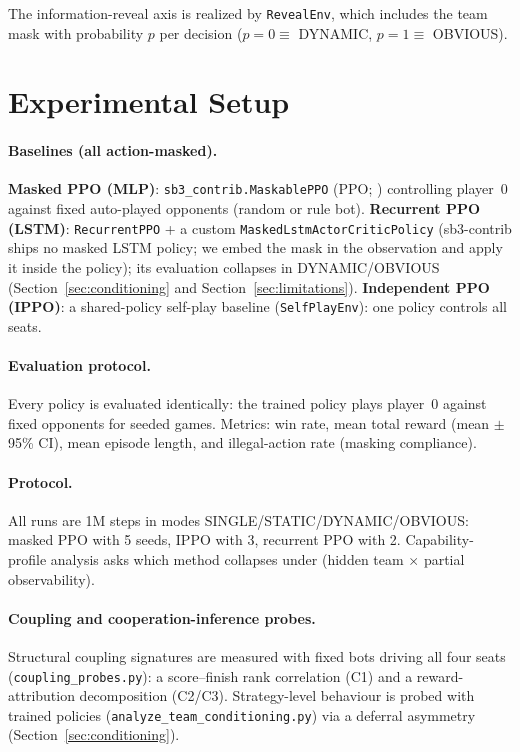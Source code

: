 \documentclass{article}
\begin{document}
The information-reveal axis is realized by \texttt{RevealEnv}, which includes
the team mask with probability $p$ per decision ($p{=}0 \equiv$ DYNAMIC,
$p{=}1 \equiv$ OBVIOUS).

\section{Experimental Setup}
\paragraph{Baselines (all action-masked).} \textbf{Masked PPO (MLP)}:
\texttt{sb3\_contrib.MaskablePPO} \citep{sb3} (PPO; \citealp{ppo}) controlling
player~0 against fixed auto-played opponents (random or rule bot).
\textbf{Recurrent PPO (LSTM)}: \texttt{RecurrentPPO} \citep{sb3} + a custom
\texttt{MaskedLstmActorCriticPolicy} (sb3-contrib ships no masked LSTM policy;
we embed the mask in the observation and apply it inside the policy); its
evaluation collapses in DYNAMIC/OBVIOUS (Section~\ref{sec:conditioning} and
Section~\ref{sec:limitations}). \textbf{Independent PPO (IPPO)}: a
shared-policy self-play baseline (\texttt{SelfPlayEnv}): one policy controls all
seats.

\paragraph{Evaluation protocol.} Every policy is evaluated identically: the
trained policy plays player~0 against fixed opponents for seeded games.
Metrics: win rate, mean total reward (mean $\pm$ 95\% CI), mean episode length,
and illegal-action rate (masking compliance).

\paragraph{Protocol.} All runs are 1M steps in modes
SINGLE/STATIC/DYNAMIC/OBVIOUS: masked PPO with 5 seeds, IPPO with 3, recurrent
PPO with 2. Capability-profile analysis asks which method collapses under
(hidden team $\times$ partial observability).

\paragraph{Coupling and cooperation-inference probes.} Structural coupling
signatures are measured with fixed bots driving all four seats
(\texttt{coupling\_probes.py}): a score--finish rank correlation (C1) and a
reward-attribution decomposition (C2/C3). Strategy-level behaviour is probed
with trained policies (\texttt{analyze\_team\_conditioning.py}) via a deferral
asymmetry (Section~\ref{sec:conditioning}).
\end{document}
